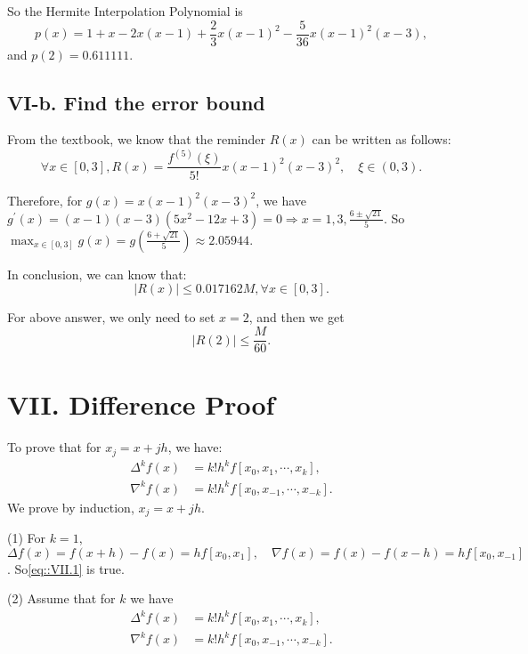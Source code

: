 \documentclass[a4paper]{article}
\begin{document}
So the Hermite Interpolation Polynomial is
\begin{equation}
  p(x) = 1 + x - 2x(x-1) + \frac{2}{3}x(x-1)^2 - \frac{5}{36}x(x-1)^2(x-3),
\end{equation}
and $p(2) = 0.611111$. 

\subsection*{VI-b. Find the error bound}
From the textbook, we know that the reminder $R(x)$ can be written as follows:
\begin{equation}
  \forall x \in [0,3], R(x) = \frac{f^{(5)} (\xi)}{5!} x(x-1)^2(x-3)^2, \quad \xi \in (0,3).
\end{equation}

Therefore, for $g(x) = x(x-1)^2(x-3)^2$, we have $g^{\prime}(x)=(x-1)(x-3)(5x^2-12x+3) = 0 \Rightarrow x=1,3,\frac{6\pm \sqrt{21}}{5}$. So $\max_{x\in[0,3]} g(x) = g(\frac{6+\sqrt{21}}{5}) \approx 2.05944$. 

In conclusion, we can know that:
\begin{equation}
  \vert R(x)\vert \leq 0.017162 M, \forall x \in [0,3].
\end{equation}

For above answer, we only need to set $x=2$, and then we get
\begin{equation}
  \vert R(2) \vert \leq \frac{M}{60}.
\end{equation}

\section*{VII. Difference Proof}
To prove that for $x_j = x+jh$, we have:
\begin{equation}
  \begin{aligned}
    \Delta^k f(x) &= k! h^k f[x_0, x_1, \cdots, x_k],\\
    \nabla^k f(x) &= k! h^{k} f[x_0, x_{-1}, \cdots, x_{-k}].
  \end{aligned}
  \label{eq::VII.1}
\end{equation}
We prove by induction, $x_j = x+jh$.

(1) For $k=1$, $\Delta f(x) = f(x+h) - f(x) = h f[x_0, x_1],\quad \nabla f(x) = f(x) - f(x-h) = h f[x_0, x_{-1}]$. So\eqref{eq::VII.1} is true.

(2) Assume that for $k$ we have 
\begin{equation}
  \begin{aligned}
    \Delta^k f(x) &= k! h^k f[x_0, x_1, \cdots, x_k],\\
    \nabla^k f(x) &= k! h^{k} f[x_0, x_{-1}, \cdots, x_{-k}].
  \end{aligned}
\end{equation}
\end{document}
